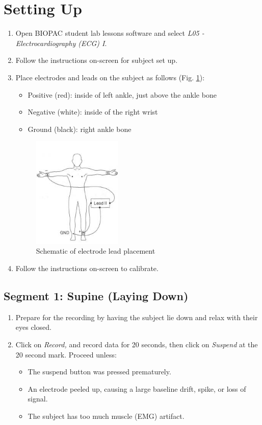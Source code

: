 \documentclass{article}
\begin{document}
\section*{Setting Up}
\begin{enumerate}
	\item Open BIOPAC student lab lessons software and select \textit{L05 - Electrocardiography (ECG) I}.
	\item Follow the instructions on-screen for subject set up.
	\item Place electrodes and leads on the subject as follows (Fig. \ref{ecg}):\begin{itemize}
		\item Positive (red): inside of left ankle, just above the ankle bone
		\item Negative (white): inside of the right wrist
		\item Ground (black): right ankle bone
	\end{itemize}
	\begin{figure}[h]
	\centering\includegraphics[width=0.4\textwidth]{../images/ECG_I_3.jpg}
	\caption{Schematic of electrode lead placement}
	\label{ecg}
	\end{figure}
	\item Follow the instructions on-screen to calibrate.
\end{enumerate}



\subsection*{Segment 1: Supine (Laying Down)}
\begin{enumerate}
	\item Prepare for the recording by having the subject lie down and relax with their eyes closed.
	\item Click on \textit{Record,} and record data for 20 seconds, then click on \textit{Suspend} at the 20 second mark. Proceed unless:
		\begin{itemize}
			\item The suspend button was pressed prematurely.
			\item An electrode peeled up, causing a large baseline drift, spike, or loss of signal.
			\item The subject has too much muscle (EMG) artifact.
		\end{itemize}
\end{enumerate}
\end{document}
